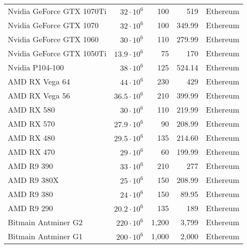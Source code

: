 \begin{longtable}{|p{}|r|r|r|p{}|}
  Nvidia GeForce GTX 1070Ti                                           & $ 32 \cdot 10^6$ & 100 & 519 & Ethereum \\
  Nvidia GeForce GTX 1070                                             & $ 32 \cdot 10^6$ & 100 & 349.99 & Ethereum \\
  Nvidia GeForce GTX 1060                                             & $ 30 \cdot 10^6$ & 110 & 279.99 & Ethereum \\
  Nvidia GeForce GTX 1050Ti                                           & $ 13.9 \cdot 10^6$ & 75 & 170 & Ethereum \\
  Nvidia P104-100                                                     & $ 38 \cdot 10^6$ & 125 & 524.14 & Ethereum \\
  AMD RX Vega 64                                                      & $ 44 \cdot 10^6$ & 230 & 429 & Ethereum \\
  AMD RX Vega 56                                                      & $ 36.5 \cdot 10^6$ & 210 & 399.99 & Ethereum \\
  AMD RX 580                                                          & $ 30 \cdot 10^6$ & 110 & 219.99 & Ethereum \\
  AMD RX 570                                                          & $ 27.9 \cdot 10^6$ & 90 & 208.99 & Ethereum \\
  AMD RX 480                                                          & $ 29.5 \cdot 10^6$ & 135 & 214.60 & Ethereum \\
  AMD RX 470                                                          & $ 29 \cdot 10^6$ & 60 & 199.99 & Ethereum \\
  AMD R9 390                                                          & $ 33 \cdot 10^6$ & 210 & 277 & Ethereum \\
  AMD R9 380X                                                         & $ 25 \cdot 10^6$ & 150 & 208.99 & Ethereum \\
  AMD R9 380                                                          & $ 24 \cdot 10^6$ & 150 & 89.95 & Ethereum \\
  AMD R9 290                                                          & $ 20.2 \cdot 10^6$ & 135 & 189 & Ethereum \\
  Bitmain Antminer G2                                                 & $220 \cdot 10^6$ & 1,200 & 3,799 & Ethereum \\
  Bitmain Antminer G1                                                 & $200 \cdot 10^6$ & 1,000 & 2,000 & Ethereum \\

\end{longtable}
